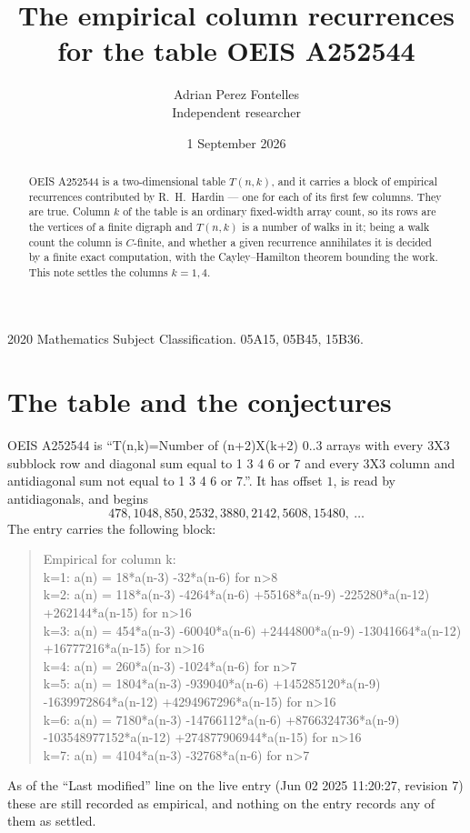 \documentclass[11pt,a4paper]{article}
\title{The empirical column recurrences for the table OEIS A252544}
\author{Adrian Perez Fontelles\\ \small Independent researcher}
\date{1 September 2026}
\theoremstyle{plain}
\theoremstyle{definition}
\begin{document}
\maketitle

\begin{abstract}
OEIS A252544 is a two-dimensional table $T(n,k)$, and it carries a block of empirical
recurrences contributed by R.~H.~Hardin --- one for each of its first few columns. They are
true. Column $k$ of the table is an ordinary fixed-width array count, so its rows are the
vertices of a finite digraph and $T(n,k)$ is a number of walks in it; being a walk count the
column is $C$-finite, and whether a given recurrence annihilates it is decided by a finite
exact computation, with the Cayley--Hamilton theorem bounding the work. This note settles the columns $k=1, 4$.
\end{abstract}

\noindent\small 2020 Mathematics Subject Classification. 05A15, 05B45, 15B36.\normalsize

\section{The table and the conjectures}

OEIS A252544 is ``T(n,k)=Number of (n+2)X(k+2) 0..3 arrays with every 3X3 subblock row and diagonal sum equal to 1 3 4 6 or 7 and every 3X3 column and antidiagonal sum not equal to 1 3 4 6 or 7.''. It has offset $1$, is
read by antidiagonals, and begins
\[
478, 1048, 850, 2532, 3880, 2142, 5608, 15480,\ \dots
\]
The entry carries the following block:
\begin{quote}\small
Empirical for column k:\\
k=1: a(n) = 18*a(n-3) -32*a(n-6) for n>8\\
k=2: a(n) = 118*a(n-3) -4264*a(n-6) +55168*a(n-9) -225280*a(n-12) +262144*a(n-15) for n>16\\
k=3: a(n) = 454*a(n-3) -60040*a(n-6) +2444800*a(n-9) -13041664*a(n-12) +16777216*a(n-15) for n>16\\
k=4: a(n) = 260*a(n-3) -1024*a(n-6) for n>7\\
k=5: a(n) = 1804*a(n-3) -939040*a(n-6) +145285120*a(n-9) -1639972864*a(n-12) +4294967296*a(n-15) for n>16\\
k=6: a(n) = 7180*a(n-3) -14766112*a(n-6) +8766324736*a(n-9) -103548977152*a(n-12) +274877906944*a(n-15) for n>16\\
k=7: a(n) = 4104*a(n-3) -32768*a(n-6) for n>7\\
\end{quote}
As of the ``Last modified'' line on the live entry (Jun 02 2025 11:20:27, revision 7) these are still
recorded as empirical, and nothing on the entry records any of them as settled.
\end{document}
